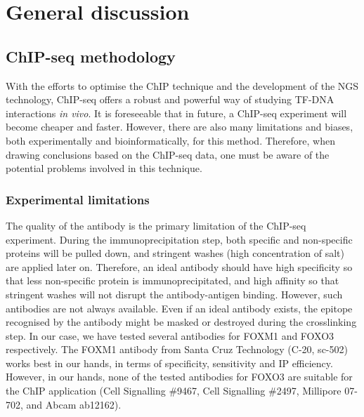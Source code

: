 \chapter{General discussion} \label{ch:discussion}

\section{ChIP-seq methodology}

With the efforts to optimise the ChIP technique and the development of the NGS technology, ChIP-seq offers a robust and powerful way of studying TF-DNA interactions \textit{in vivo}. It is foreseeable that in future, a ChIP-seq experiment will become cheaper and faster. However, there are also many limitations and biases, both experimentally and bioinformatically, for this method. Therefore, when drawing conclusions based on the ChIP-seq data, one must be aware of the potential problems involved in this technique.

\subsection{Experimental limitations} \label{section:chiplimitation}

The quality of the antibody is the primary limitation of the ChIP-seq experiment. During the immunoprecipitation step, both specific and non-specific proteins will be pulled down, and stringent washes (high concentration of salt) are applied later on. Therefore, an ideal antibody should have high specificity so that less non-specific protein is immunoprecipitated, and high affinity so that stringent washes will not disrupt the antibody-antigen binding. However, such antibodies are not always available. Even if an ideal antibody exists, the epitope recognised by the antibody might be masked or destroyed during the crosslinking step. In our case, we have tested several antibodies for FOXM1 and FOXO3 respectively. The FOXM1 antibody from Santa Cruz Technology (C-20, sc-502) works best in our hands, in terms of specificity, sensitivity and IP efficiency. However, in our hands, none of the tested antibodies for FOXO3 are suitable for the ChIP application (Cell Signalling \#9467, Cell Signalling \#2497, Millipore 07-702, and Abcam ab12162).


